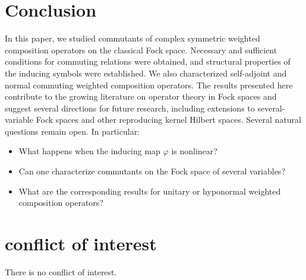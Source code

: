 \documentclass[reqno]{amsart}
\theoremstyle{remark}
\theoremstyle{Definition}
\theoremstyle{remark}
\numberwithin{equation}{section}
\begin{document}
\section{Conclusion}
In this paper, we studied commutants of complex symmetric weighted composition operators on the classical Fock space. Necessary and sufficient conditions for commuting relations were obtained, and structural properties of the inducing symbols were established. We also characterized self-adjoint and normal commuting weighted composition operators. The results presented here contribute to the growing literature on operator theory in Fock spaces and suggest several directions for future research, including extensions to several-variable Fock spaces and other reproducing kernel Hilbert spaces.
Several natural questions remain open. In particular:
\begin{itemize}
\item What happens when the inducing map $\varphi$ is nonlinear?
\item Can one characterize commutants on the Fock space of several variables?
\item What are the corresponding results for unitary or hyponormal weighted composition operators?

\end{itemize}

\section{conflict of interest}
There is no conflict of interest.
\end{document}
